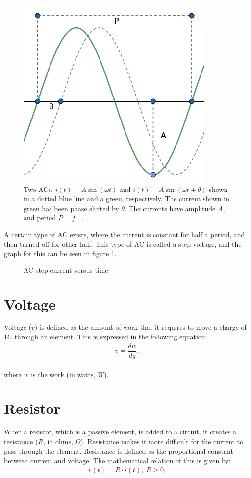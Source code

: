 \begin{figure}[H]
	\centering
	\includegraphics[scale=0.7]{fig/img/AC.png}
	\caption{Two ACs, $i(t)=A\sin(\omega t)$ and $i(t)=A\sin(\omega t+\theta)$ shown in a dotted blue line and a green, respectively. The current shown in green has been phase shifted by $\theta$. The currents have amplitude $A$, and period $P=f^{-1}$.}
\end{figure}
\noindent A certain type of AC exists, where the current is constant for half a period, and then turned off for other half. This type of AC is called a step voltage, and the graph for this can be seen in figure \ref{fig:AC_step}.
\begin{figure}[H] 

\caption{AC step current versus time}
\label{fig:AC_step}
\end{figure}
\section{Voltage}
Voltage ($v$) is defined as the amount of work that it requires to move a charge of $1 C$ through an element. This is expressed in the following equation: \cite[p. 8]{bcircuit}
\begin{align*}
	v=\dfrac{dw}{dq},
\end{align*}
\\
where $w$ is the work (in watts, $W$).
\section{Resistor}
When a resistor, which is a passive element, is added to a circuit, it creates a resistance ($R$, in ohms, $\Omega$). Resistance makes it more difficult for the current to pass through the element. Resistance is defined as the proportional constant between current and voltage. The mathematical relation of this is given by: \cite[p.~22]{bcircuit5}
\begin{align} 
\label{Ohm}
v(t)=R\cdot i(t),\ R\geq0,
\end{align}
